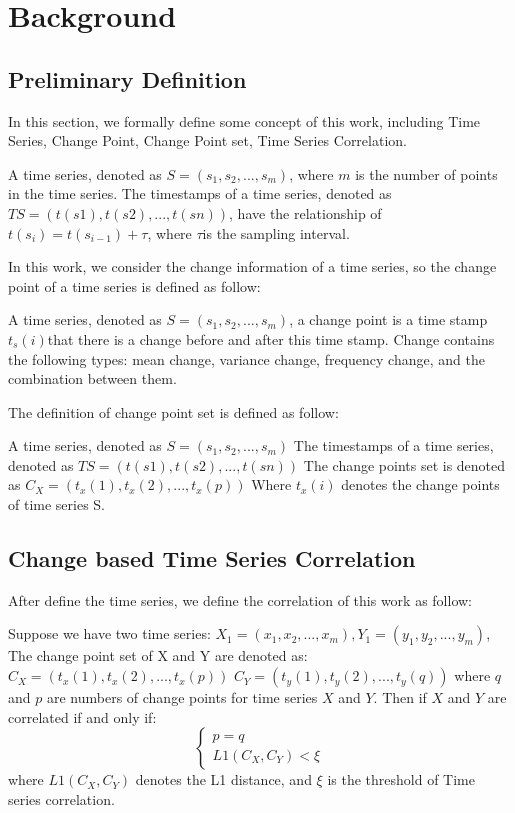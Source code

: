\section{Background}
\label{sec:formulation}

\subsection{Preliminary Definition}

In this section, we formally define some concept of this work, including Time Series, Change Point, Change Point set, Time Series Correlation.

\begin{definition}
A time series, denoted as $S = (s_1,s_2,...,s_m)$, where $m$ is the number of points in the time series. The timestamps of a time series, denoted as $TS = (t(s1), t(s2),..., t(sn))$, have the relationship of $t(s_i) = t(s_{i-1})+\tau$, where $\tau$is the sampling interval.
\end{definition}

In this work, we consider the change information of a time series, so the change point of a time series is defined as follow:
\begin{definition}
A time series, denoted as $S = (s_1,s_2,...,s_m)$, a change point is a time stamp $t_s(i)$that there is a change before and after this time stamp. Change contains the following types: mean change, variance change,  frequency change, and the combination between them.
\end{definition}

The definition of change point set is defined as follow:
\begin{definition}
A time series, denoted as
$S = (s_1,s_2,...,s_m)$
The timestamps of a time series, denoted as 
$TS = (t(s1), t(s2),..., t(sn))$
The change points set is denoted as 
$C_X=(t_x(1),t_x(2),...,t_x(p))$
Where $t_x(i)$ denotes the change points of time series S.
\end{definition}


\subsection{Change based Time Series Correlation}

After define the time series, we define the correlation of this work as follow:
\begin{definition} 
Suppose we have two time series: $X_1=(x_1,x_2,...,x_m),Y_1=(y_1,y_2,...,y_m)$, The change point set of X and Y are denoted as: 
$C_X=(t_x(1),t_x(2),...,t_x(p))$
$C_Y=(t_y(1),t_y(2),...,t_y(q))$
where $q$ and $p$ are numbers of change points for time series $X$ and $Y$.
Then if $X$ and $Y$ are correlated if and only if:
\begin{equation}
\left\{\begin{matrix}
p=q\\ 
L1(C_X,C_Y)<\xi 
\end{matrix}\right.
\end{equation}
where $L1(C_X,C_Y)$ denotes the L1 distance, and $\xi$ is the threshold of Time series correlation.
\end{definition}
